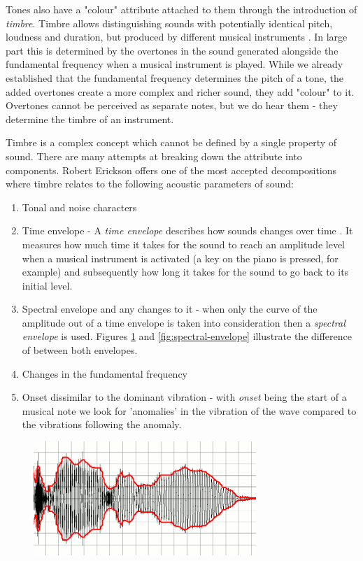 Tones also have a "colour" attribute attached to them through the introduction
of \textit{timbre}. Timbre allows distinguishing sounds with potentially
identical pitch, loudness and duration, but produced by different musical
instruments \cite{klapuri2007signal}. In large part this is determined by the
overtones in the sound generated alongside the fundamental frequency when a
musical instrument is played. While we already established that the fundamental
frequency determines the pitch of a tone, the added overtones create a more
complex and richer sound, they add "colour" to it. Overtones cannot be perceived
as separate notes, but we do hear them - they determine the timbre of an
instrument.

Timbre is a complex concept which cannot be defined by a single property of
sound. There are many attempts at breaking down the attribute into components.
Robert Erickson \cite{erickson1975sound} offers one of the most accepted
decompositions where timbre relates to the following acoustic parameters of
sound:
\begin{enumerate}
    \item Tonal and noise characters
    \item Time envelope - A \textit{time envelope} describes how sounds changes
    over time \cite{wiki:envelope}. It measures how much time it takes for the sound to reach an
    amplitude level when a musical instrument is activated (a key on the piano
    is pressed, for example) and subsequently how long it takes for the sound to
    go back to its initial level. 
    \item Spectral envelope and any changes to it - when only the curve of the
    amplitude out of a time envelope is taken into consideration then a
    \textit{spectral envelope} is used. Figures \ref{fig:time-envelope} and
    \ref{fig:spectral-envelope} illustrate the difference of between both envelopes.
    \item Changes in the fundamental frequency
    \item Onset dissimilar to the dominant vibration - with \textit{onset}
    being the start of a musical note we look for 'anomalies' in
    the vibration of the wave compared to the vibrations following the anomaly.

\end{enumerate}

\begin{figure}[H]
    \centering
    \includegraphics[width=0.75\textwidth]{BackgroundTheory/time_envelope.png}
    \label{fig:time-envelope}
\end{figure}

